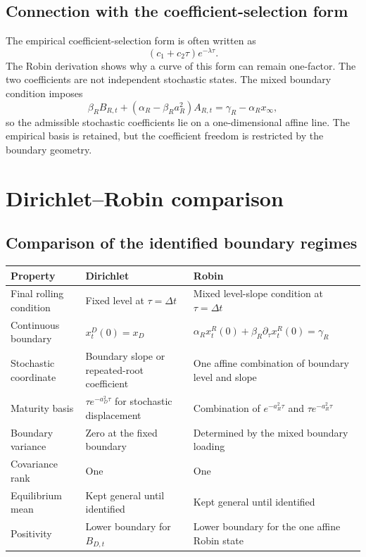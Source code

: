 \documentclass[12pt]{article}
\numberwithin{equation}{subsection}
\begin{document}
\subsection{Connection with the coefficient-selection form}

The empirical coefficient-selection form is often written as
\begin{equation}
(c_1+c_2\tau)e^{-\lambda\tau}.
\end{equation}
The Robin derivation shows why a curve of this form can remain one-factor. The two coefficients are not independent stochastic states. The mixed boundary condition imposes
\begin{equation}
\beta_RB_{R,t}
+
(\alpha_R-\beta_Ra_R^2)A_{R,t}
=
\gamma_R-\alpha_Rx_\infty,
\end{equation}
so the admissible stochastic coefficients lie on a one-dimensional affine line. The empirical basis is retained, but the coefficient freedom is restricted by the boundary geometry.

\section{Dirichlet--Robin comparison}

\subsection{Comparison of the identified boundary regimes}

\begin{center}
\renewcommand{\arraystretch}{1.35}
\begin{tabular}{>{\raggedright\arraybackslash}p{} >{\raggedright\arraybackslash}p{} >{\raggedright\arraybackslash}p{}}
\toprule
Property & Dirichlet & Robin \\
\midrule
Final rolling condition & Fixed level at $\tau=\Delta t$ & Mixed level-slope condition at $\tau=\Delta t$ \\
Continuous boundary & $x^D_t(0)=x_D$ & $\alpha_Rx^R_t(0)+\beta_R\partial_\tau x^R_t(0)=\gamma_R$ \\
Stochastic coordinate & Boundary slope or repeated-root coefficient & One affine combination of boundary level and slope \\
Maturity basis & $\tau e^{-a_D^2\tau}$ for stochastic displacement & Combination of $e^{-a_R^2\tau}$ and $\tau e^{-a_R^2\tau}$ \\
Boundary variance & Zero at the fixed boundary & Determined by the mixed boundary loading \\
Covariance rank & One & One \\
Equilibrium mean & Kept general until identified & Kept general until identified \\
Positivity & Lower boundary for $B_{D,t}$ & Lower boundary for the one affine Robin state \\
\bottomrule
\end{tabular}
\end{center}
\end{document}
